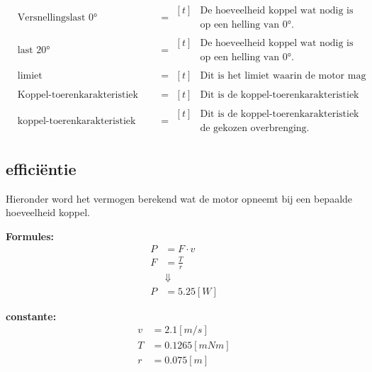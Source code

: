         \begin{align*}
                & \text{Versnellingslast 0°} &&= \begin{aligned}[t] & \text{De hoeveelheid koppel wat nodig is om maximaal te versnellen} \\ & \text{op een helling van 0°.} \end{aligned}\\
                & \text{last 20°} &&= \begin{aligned}[t] & \text{De hoeveelheid koppel wat nodig is om stil te blijven staan} \\ & \text{op een helling van 0°.} \end{aligned}\\
                & \text{limiet} &&= \begin{aligned}[t] & \text{Dit is het limiet waarin de motor mag opereren.} \end{aligned}\\
                & \text{Koppel-toerenkarakteristiek motor} &&= \begin{aligned}[t] & \text{Dit is de koppel-toerenkarakteristiek van de motor.} \end{aligned}\\
                & \text{koppel-toerenkarakteristiek na overbrenging} &&= \begin{aligned}[t] & \text{Dit is de koppel-toerenkarakteristiek van de motor na} \\ & \text{de gekozen overbrenging.} \end{aligned}
            \end{align*}

\subsection{efficiëntie}

Hieronder word het vermogen berekend wat de motor opneemt bij een bepaalde hoeveelheid koppel.

\begin{multicols}{2}
        \textbf{Formules:}
        \begin{equation}
            \begin{split}
                P &= F \cdot v \\
                F &= \frac{T}{r} \\
                &\Downarrow \\
                P &= 5.25 [W]
            \end{split}
        \end{equation}

        \textbf{constante:}
        \begin{equation*}
            \begin{split}
                v &= 2.1 [m/s] \\
                T &= 0.1265[mNm]  \\
                r &= 0.075[m]
            \end{split}
        \end{equation*}
    \end{multicols}

